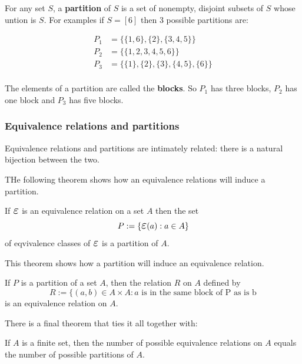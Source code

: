 \documentclass{article}
\begin{document}
For any set $S$, a \textbf{partition} of $S$ is a set of nonempty, disjoint subsets of $S$ whose untion is $S$. For examples if $S = [6]$ then 3 possible partitions are:

\begin{align*}
    P_1 &= \{\{1, 6\}, \{2\}, \{3, 4, 5\}\} \\
    P_2 &= \{\{1, 2, 3, 4, 5, 6\}\} \\
    P_3 &= \{\{1\}, \{2\}, \{3\}, \{4, 5\}, \{6\}\} \\
\end{align*}

The elements of a partition are called the \textbf{blocks}. So $P_1$ has three blocks, $P_2$ has one block and $P_3$ has five blocks.

\subsubsection{Equivalence relations and partitions}
Equivalence relations and partitions are intimately related: there is a natural bijection between the two.

THe following theorem shows how an equivalence relations will induce a partition.

\begin{thm}
If $\veps$ is an equivalence relation on a set $A$ then the set
\begin{equation*}
    P := \{\veps (a) : a \in A \}
\end{equation*}
of eqvivalence classes of $\veps$ is a partition of $A$.
\end{thm}

This theorem shows how a partition will induce an equivalence relation.

\begin{thm}
If $P$ is a partition of a set $A$, then the relation $R$ on $A$ defined by
\begin{equation*}
    R := \{(a,b) \in A \times A: a \text{ is in the same block of P as is b}
\end{equation*}
is an equivalence relation on $A$.
\end{thm}

There is a final theorem that ties it all together with:

\begin{thm}
If $A$ is a finite set, then the number of possible equivalence relations on $A$ equals the number of possible partitions of $A$.
\end{thm}
\end{document}
